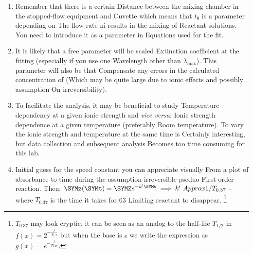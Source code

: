 {\begin{enumerate}
\item Remember that there is a certain
  Distance between the mixing chamber in the stopped-flow equipment and
  Cuvette which means that $ t_0 $ is a parameter depending on
  The flow rate ni results in the mixing of
  Reactant solutions. You need to introduce it as a parameter in
  Equations used for the fit.
\item It is likely that a free parameter will be scaled
  Extinction coefficient at the fitting (especially if you use one
  Wavelength other than $\lambda_\mathrm{max}$). This parameter will also be that
  Compensate any errors in the calculated concentration of 
  (Which may be quite large due to ionic effects and possibly assumption
  On irreversibility).
\item To facilitate the analysis, it may be beneficial to study
  Temperature dependency at a given ionic strength and {\em vice versa}:
  Ionic strength dependence at a given temperature (preferably
  Room temperature). To vary the ionic strength and temperature at the same time is
  Certainly interesting, but data collection and subsequent analysis
  Becomes too time consuming for this lab.
\item Initial guess for the speed constant you can appreciate visually
  From a plot of absorbance to time during the assumption irreversible pseduo
  First order reaction. Then: $\SYMz(\SYMt) = \SYMZ e^{-k'\SYMt} \implies k'
  \ Approx 1 / T_ {0.37} $ - where $ T_ {0.37} $ is the time it takes for 63%
  Limiting reactant to disappear. \footnote{$ T_ {0.37} $ may look
    cryptic, it can be seen as an analog to the half-life $T_{1/2}$ in
  $f(x) = 2^{-\frac{t}{T_{1/2}}}$ but when the base is $e$
    we write the expression as $g(x) = e^{-\frac{t}{T_{0.37}}} $.}
\end{enumerate}

}
